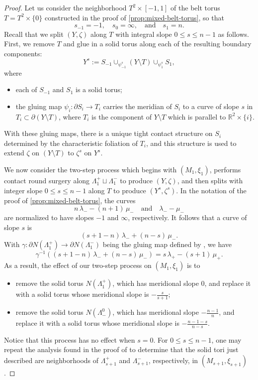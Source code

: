 \documentclass[10pt,a4paper]{amsart}
\begin{document}
\begin{proof}
Let us consider the neighborhood $T^2\times[-1,1]$ of the belt torus $T=T^2\times\{0\}$ constructed in the proof of \cref{prop:mixed-belt-torus}, so that
\[
s_{-1} = -1,
\quad
s_0 = \infty,
\quad\text{and}\quad
s_1 = n.
\]
Recall that we split $(Y,\zeta)$ along $T$ with integral slope $0\leq s\leq n-1$ as follows.  First, we remove $T$ and glue in a solid torus along each of the resulting boundary components:
\[
Y^s := S_{-1} \cup_{\psi^s_{-1}} (Y\setminus T) \cup_{\psi^s_1} S_1,
\]
where
\begin{itemize}
    \item each of $S_{-1}$ and $S_1$ is a solid torus;
    \item the gluing map $\psi_i\colon\partial S_i\to T_i$ carries the meridian of $S_i$ to a curve of slope $s$ in $T_i\subset\partial(Y\setminus T)$, where $T_i$ is the component of $Y\setminus T$ which is parallel to $\mathbb{R}^2\times\{i\}$.
\end{itemize}
With these gluing maps, there is a unique tight contact structure on $S_i$ determined by the characteristic foliation of $T_i$, and this structure is used to extend $\zeta$ on $(Y\setminus T)$ to $\zeta^s$ on $Y^s$.

We now consider the two-step process which begins with $(M_1,\xi_1)$, performs contact round surgery along $\Lambda_1^+\sqcup\Lambda_1^-$ to produce $(Y,\zeta)$, and then splits with integer slope $0\leq s\leq n-1$ along $T$ to produce $(Y^s,\zeta^s)$.  In the notation of the proof of \cref{prop:mixed-belt-torus}, the curves
\[
n\,\lambda_- - (n+1)\,\mu_-
\quad\text{and}\quad
\lambda_--\mu_-
\]
are normalized to have slopes $-1$ and $\infty$, respectively.  It follows that a curve of slope $s$ is
\[
(s+1-n)\,\lambda_- + (n-s)\,\mu_-.
\]
With $\gamma\colon\partial N(\Lambda_1^+)\to\partial N(\Lambda_1^-)$ being the gluing map defined by , we have
\[
\gamma^{-1}((s+1-n)\,\lambda_- + (n-s)\,\mu_-) = s\,\lambda_+ - (s+1)\,\mu_+.
\]
As a result, the effect of our two-step process on $(M_1,\xi_1)$ is to
\begin{itemize}
    \item remove the solid torus $N(\Lambda_1^+)$, which has meridional slope $0$, and replace it with a solid torus whose meridional slope is $-\tfrac{s}{s+1}$;
    \item remove the solid torus $N(\Lambda_-^0)$, which has meridional slope $-\tfrac{n-1}{n}$, and replace it with a solid torus whose meridional slope is $-\tfrac{n-1-s}{n-s}$.
\end{itemize}
Notice that this process has no effect when $s=0$.  For $0\leq s\leq n-1$, one may repeat the analysis found in the proof of  to determine that the solid tori just described are neighborhoods of $\Lambda_{s+1}^+$ and $\Lambda_{s+1}^-$, respectively, in $(M_{s+1},\xi_{s+1})$.
\end{proof}
\end{document}
